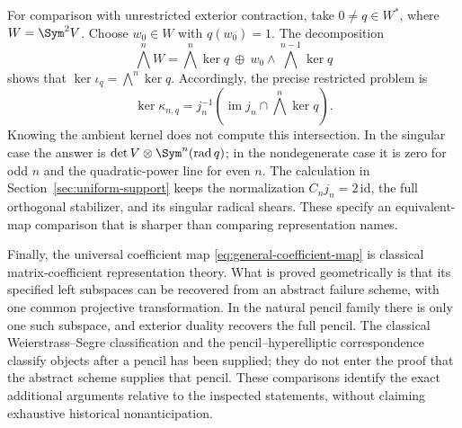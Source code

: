 For comparison with unrestricted exterior contraction, take
\(0\ne q\in W^*\), where \(W=\Sym^2V\).  Choose
\(w_0\in W\) with \(q(w_0)=1\).  The decomposition
\[
 \bigwedge^nW=
 \bigwedge^n\ker q\ \oplus\
     w_0\wedge\bigwedge^{n-1}\ker q
\]
shows that \(\ker\iota_q=\bigwedge^n\ker q\).  Accordingly,
the precise restricted problem is
\begin{equation}\label{eq:restricted-exterior-intersection}
 \ker\kappa_{n,q}=j_n^{-1}\!\left(
     \operatorname{im}j_n\cap\bigwedge^n\ker q\right).
\end{equation}
Knowing the ambient kernel does not compute this intersection.  In
the singular case the answer is
\(\det V\otimes\Sym^n(\operatorname{rad}q)\); in the
nondegenerate case it is zero for odd \(n\) and the
quadratic-power line for even \(n\).  The calculation in
Section~\ref{sec:uniform-support} keeps the normalization
\(C_nj_n=2\,\mathrm{id}\), the full orthogonal stabilizer,
and its singular radical shears.  These specify an equivalent-map
comparison that is sharper than comparing representation names.

Finally, the universal coefficient map
\eqref{eq:general-coefficient-map} is classical matrix-coefficient
representation theory.  What is proved geometrically is that its
specified left subspaces can be recovered from an abstract failure
scheme, with one common projective transformation.  In the natural
pencil family there is only one such subspace, and exterior duality
recovers the full pencil.  The classical Weierstrass--Segre
classification and the pencil--hyperelliptic correspondence classify
objects after a pencil has been supplied; they do not enter the proof
that the abstract scheme supplies that pencil.  These comparisons
identify the exact additional arguments relative to the inspected
statements, without claiming exhaustive historical nonanticipation.
